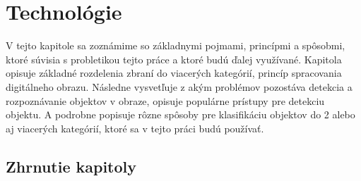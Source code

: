 \chapter{Technológie}   %
\label{chap:technologie}

V tejto kapitole sa zoznámime so základnymi pojmami, princípmi a spôsobmi, ktoré súvisia s probletikou tejto práce a ktoré budú ďalej využívané.
Kapitola opisuje základné rozdelenia zbraní do viacerých kategórií, princíp spracovania digitálneho obrazu.
Následne vysvetľuje z akým problémov pozostáva detekcia a rozpoznávanie objektov v obraze, opisuje populárne prístupy pre detekciu objektu.
A podrobne popisuje rôzne spôsoby pre klasifikáciu objektov do 2 alebo aj viacerých kategórií, ktoré sa v tejto práci budú používať.













\section{Zhrnutie kapitoly}


